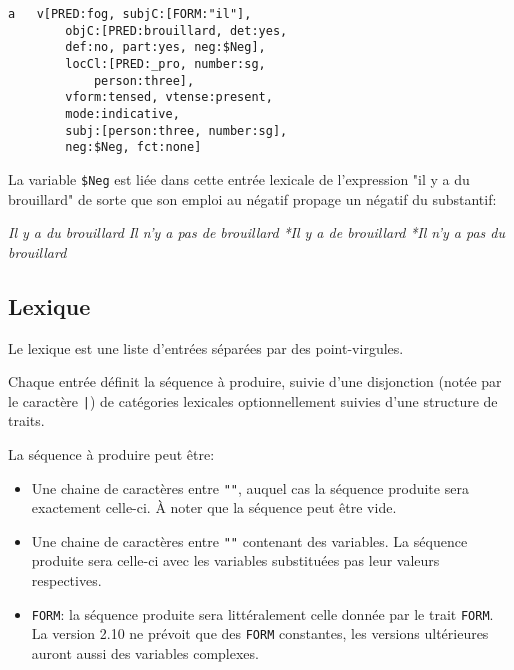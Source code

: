 \documentclass[11pt]{article}
\begin{document}
\begin{itemize}
\begin{lstlisting}[numbers=none]
a	v[PRED:fog, subjC:[FORM:"il"], 
		objC:[PRED:brouillard, det:yes, 
		def:no, part:yes, neg:$Neg], 
		locCl:[PRED:_pro, number:sg, 
			person:three], 
		vform:tensed, vtense:present, 
		mode:indicative, 
		subj:[person:three, number:sg], 
		neg:$Neg, fct:none]
\end{lstlisting}

La variable \verb#$Neg# est liée dans cette entrée lexicale de l'expression "il y
a du brouillard" de sorte que son emploi au négatif propage un négatif
du substantif:

\begin{exe}
\ex \begin{xlist} 
\ex \label{0-a} \textit{Il y a du brouillard}
\ex \label{0-a}  \textit{Il n'y a pas de brouillard}
\ex \label{0-a} \textit{*Il y a de brouillard}
\ex \label{0-a} \textit{*Il n'y a pas du brouillard}
\end{xlist}
\end{exe}

\end{itemize}



\subsection{Lexique}

Le lexique est une liste d'entrées séparées par des point-virgules.

Chaque entrée définit la séquence à produire, suivie d'une disjonction
(notée par le caractère \verb#|#) de catégories lexicales
optionnellement suivies d'une structure de traits.

La séquence à produire peut être:

\begin{itemize}
\item Une chaine de caractères entre \verb#""#, auquel cas la séquence
  produite sera exactement celle-ci. À noter que la séquence peut être vide.

\item Une chaine de caractères entre \verb#""# contenant des
  variables. La séquence produite sera celle-ci avec les variables
  substituées pas leur valeurs respectives.

\item \texttt{FORM}: la séquence produite sera littéralement celle
  donnée par le trait \texttt{FORM}. La version 2.10 ne prévoit que
  des \texttt{FORM} constantes, les versions ultérieures auront aussi
  des variables complexes.

\end{itemize}
\end{document}
